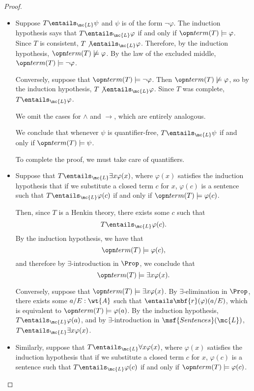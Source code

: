 \documentclass[11pt]{article}
\begin{document}
\begin{proof}
\begin{itemize}
\item Suppose $T \entails_{\mc{L}} \psi$ and $\psi$ is of the form $\neg \varphi$. The induction hypothesis says that $T \entails_{\mc{L}} \varphi$ if and only if $\term(T) \models \varphi$. Since $T$ is consistent, $T \not \entails_{\mc{L}} \varphi$. Therefore, by the induction hypothesis, $\term(T) \not \models \varphi$. By the law of the excluded middle, $\term(T) \models \neg \varphi$.

 Conversely, suppose that $\term(T) \models \neg \varphi$. Then $\term(T) \not \models \varphi$, so by the induction hypothesis, $T \not \entails_{\mc{L}} \varphi$. Since $T$ was complete, $T \entails_{\mc{L}} \varphi$.

We omit the cases for $\wedge$ and $\rightarrow$, which are entirely analogous.

We conclude that whenever $\psi$ is quantifier-free, $T \entails_{\mc{L}} \psi$ if and only if $\term(T) \models \psi$.

To complete the proof, we must take care of quantifiers.

\item Suppose that $T \entails_{\mc{L}} \exists x \varphi(x)$, where $\varphi(x)$ satisfies the induction hypothesis that if we substitute a closed term $c$ for $x$, $\varphi(c)$ is a sentence such that $T \entails_{\mc{L}} \varphi(c)$ if and only if $\term(T) \models \varphi(c)$.

  Then, since $T$ is a Henkin theory, there exists some $c$ such that
  $$
T \entails_{\mc{L}} \varphi(c).
$$
By the induction hypothesis, we have that
$$
\term(T) \models \varphi(c),
$$
and therefore by $\exists$-introduction in $\Prop$, we conclude that
$$
\term(T) \models \exists x \varphi(x).
$$

  Conversely, suppose that $\term(T) \models \exists x \varphi(x)$. By $\exists$-elimination in $\Prop$, there exists some $a/E : \wt{A}$ such that $\entails \mbf{r}(\varphi)(a/E)$, which is equivalent to $\term(T) \models \varphi(a)$. By the induction hypothesis, $T \entails_{\mc{L}} \varphi(a)$, and by $\exists$-introduction in $\msf{Sentences}(\mc{L})$, $T \entails_{\mc{L}} \exists x \varphi(x)$.

\item Similarly, suppose that $T \entails_{\mc{L}} \forall x \varphi(x)$, where $\varphi(x)$ satisfies the induction hypothesis that if we substitute a closed term $c$ for $x$, $\varphi(c)$ is a sentence such that $T \entails_{\mc{L}} \varphi(c)$ if and only if $\term(T) \models \varphi(c)$.


\end{itemize}
\end{proof}
\end{document}
